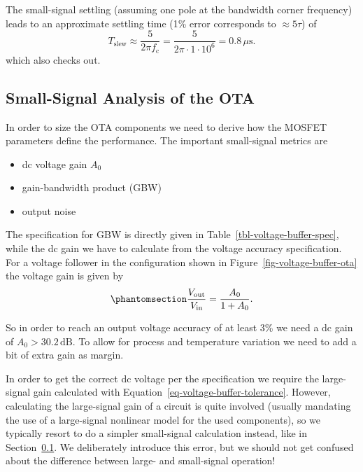 \documentclass[
  a4paper,
  DIV=11,
  numbers=noendperiod]{scrartcl}
\providecommand{\tightlist}{%
  \setlength{\itemsep}{0pt}\setlength{\parskip}{0pt}}\usepackage{longtable,booktabs,array}
\begin{document}
The small-signal settling (assuming one pole at the bandwidth corner
frequency) leads to an approximate settling time (1\% error corresponds
to \(\approx 5 \tau\)) of \[
T_\mathrm{slew} \approx \frac{5}{2 \pi f_\mathrm{c}} = \frac{5}{2 \pi \cdot 1 \cdot 10^{6}} = 0.8\,\mu\text{s}.
\] which also checks out.

\subsection{Small-Signal Analysis of the
OTA}\label{sec-basic-ota-small-signal}

In order to size the OTA components we need to derive how the MOSFET
parameters define the performance. The important small-signal metrics
are

\begin{itemize}
\tightlist
\item
  dc voltage gain \(A_0\)
\item
  gain-bandwidth product (GBW)
\item
  output noise
\end{itemize}

The specification for GBW is directly given in
Table~\ref{tbl-voltage-buffer-spec}, while the dc gain we have to
calculate from the voltage accuracy specification. For a voltage
follower in the configuration shown in
Figure~\ref{fig-voltage-buffer-ota} the voltage gain is given by
\begin{equation}\phantomsection\label{eq-voltage-buffer-tolerance}{
\frac{V_\mathrm{out}}{V_\mathrm{in}} = \frac{A_0}{1 + A_0}.
}\end{equation}

So in order to reach an output voltage accuracy of at least 3\% we need
a dc gain of \(A_0 > 30.2\,\text{dB}\). To allow for process and
temperature variation we need to add a bit of extra gain as margin.

\begin{tcolorbox}[enhanced jigsaw, opacityback=0, title=\textcolor{quarto-callout-important-color}{\faExclamation}\hspace{0.5em}{Small-Signal vs.~Large-Signal Operation}, leftrule=.75mm, bottomtitle=1mm, breakable, bottomrule=.15mm, opacitybacktitle=0.6, colbacktitle=quarto-callout-important-color!10!white, colframe=quarto-callout-important-color-frame, toptitle=1mm, titlerule=0mm, colback=white, rightrule=.15mm, coltitle=black, toprule=.15mm, left=2mm, arc=.35mm]

In order to get the correct dc voltage per the specification we require
the large-signal gain calculated with
Equation~\ref{eq-voltage-buffer-tolerance}. However, calculating the
large-signal gain of a circuit is quite involved (usually mandating the
use of a large-signal nonlinear model for the used components), so we
typically resort to do a simpler small-signal calculation instead, like
in Section~\ref{sec-basic-ota-small-signal}. We deliberately introduce
this error, but we should not get confused about the difference between
large- and small-signal operation!

\end{tcolorbox}
\end{document}
